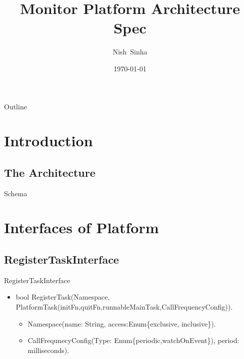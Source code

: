 \documentclass{beamer}
\title[Monitor Platform Architecture Specs] 
{%
Monitor Platform Architecture Spec %
}
\author[Sinha N]
{
  Nish~Sinha\inst{1} \and
}
\institute[Xad]
{
  \inst{1}%
  Xad Inc., Mountain View, USA
  \and
  \vskip-2mm
}
\date[\today]
{\today}
\newcommand{\drawLinkArrow}[4]{
		\pgfmathparse{2pt+3.5pt}
	\draw[->] let
		\p1 = (#1), \p2 = (#2),
		\p3 = (#3), \p4 = (#4)
		in
		({(\x1 + \x2)*1/2} ,\y1) -- ({(\x3 + \x4)*1/2} ,\y4);
}
\newcommand{\drawBox}[3]{
		\shade[top color=yellow,bottom color=black] (#1) rectangle (#2) node[midway,below] {#3};
}
\begin{document}
\begin{frame}
  \titlepage
\end{frame}

\begin{frame}{Outline}
  \tableofcontents
\end{frame}


\section{Introduction}

\subsection{The Architecture}

\begin{frame}{Schema}

\end{frame}

\section{Interfaces of Platform}
\subsection {RegisterTaskInterface}
\begin{frame}
	\begin{block}{RegisterTaskInterface}
		\begin{itemize}
			\item bool \alert{RegisterTask}(Namespace, PlatformTask(initFn,quitFn,runnableMainTask,CallFrequencyConfig)).
			\begin{itemize}
				\item Namespace(name: String, access:Enum\{exclusive, inclusive\}).
				\item CallFrequnecyConfig(Type: Enum\{periodic,watchOnEvent\}), period: milliseconds).
			\end{itemize}
		\end{itemize}
	\end{block}
\end{frame}
\end{document}
